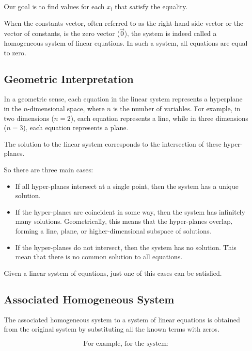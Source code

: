 Our goal is to find values for each $x_i$ that satisfy the equality.

When the constants vector, often referred to as the right-hand side vector or the vector of constants, is the zero vector ($\vec{0}$), the system is indeed called a homogeneous system of linear equations. In such a system, all equations are equal to zero.

\subsection{Geometric Interpretation}
In a geometric sense, each equation in the linear system represents a hyperplane in the $n$-dimensional space, where $n$ is the number of variables. For example, in two dimensions ($n=2$), each equation represents a line, while in three dimensions ($n=3$), each equation represents a plane.

The solution to the linear system corresponds to the intersection of these hyper-planes. 

So there are three main cases:

\begin{itemize}
    \item If all hyper-planes intersect at a single point, then the system has a unique solution.
    \item If the hyper-planes are coincident in some way, then the system has infinitely many solutions. Geometrically, this means that the hyper-planes overlap, forming a line, plane, or higher-dimensional subspace of solutions.
    \item If the hyper-planes do not intersect, then the system has no solution. This mean that there is no common solution to all equations.
\end{itemize}

Given a linear system of equations, just one of this cases can be satisfied.

\subsection{Associated Homogeneous System}

The associated homogeneous system to a system of linear equations is obtained from the original system by substituting all the known terms with zeros. 

\[
\text{For example, for the system:}
\]

